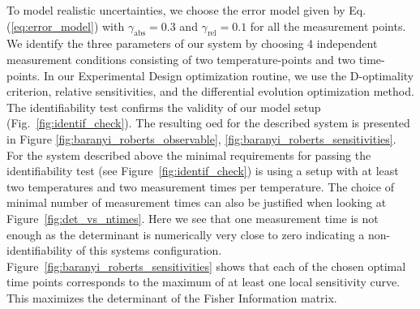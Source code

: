 \documentclass[graybox]{svmult}
\begin{document}
To model realistic uncertainties, we choose the error model given by Eq. (\ref{eq:error_model}) with $\gamma_\text{abs}=0.3$ and $\gamma_\text{rel}=0.1$ for all the measurement points.
We identify the three parameters of our system by choosing 4 independent measurement conditions consisting of two temperature-points and two time-points.
In our Experimental Design optimization routine, we use the D-optimality criterion, relative sensitivities, and the differential evolution optimization method.
The identifiability test confirms the validity of our model setup (Fig.~\ref{fig:identif_check}).
The resulting \ac{oed} for the described system is presented in Figure \ref{fig:baranyi_roberts_observable}, \ref{fig:baranyi_roberts_sensitivities}.
%
%
For the system described above the minimal requirements for passing the identifiability test (see Figure~\ref{fig:identif_check}) is using a setup with at least two temperatures and two measurement times per temperature.
The choice of minimal number of measurement times can also be justified when looking at Figure~\ref{fig:det_vs_ntimes}.
Here we see that one measurement time is not enough as the determinant is numerically very close to zero indicating a non-identifiability of this systems configuration.
%
%
Figure~\ref{fig:baranyi_roberts_sensitivities} shows that each of the chosen optimal time points corresponds to the maximum of at least one local sensitivity curve.
This maximizes the determinant of the Fisher Information matrix.
%
%
%
\end{document}
